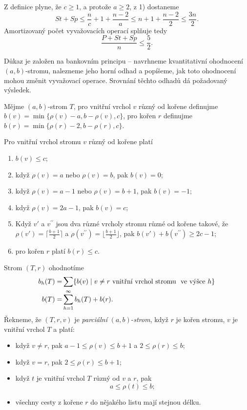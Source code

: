 \documentclass[a4paper,12pt]{article}
\begin{document}
Z definice plyne, že $c\ge 1$, a protože $a\ge 2$, z 1) dostaneme
$$St+Sp\le\frac nc+1+\frac {n-2}a\le n+1+\frac {n-2}2\le\frac {3n}
2.$$
Amortizovaný počet vyvažovacích operací splňuje tedy 
$$\frac {P+St+Sp}n\le\frac 52.$$

Důkaz je založen na bankovním principu -- 
navrhneme kvantitativní ohodnocení $(a,b)$-stromu, 
nalezneme jeho horní odhad a popíšeme, jak 
toto ohodnocení mohou změnit vyvažo\-vací ope\-race. Srovnání 
těchto odhadů dá požadovaný výsledek.

Mějme $(a,b)$-strom $T$, pro vnitřní vrchol 
$v$ různý od kořene definuj\-me 
$b(v)=\min\{\rho (v)-a,b-\rho (v),c\}$, pro 
kořen $r$ definuj\-me $b(r)=\min\{\rho (r)-2,b-\rho (r),c\}$. 

\begin{pozorovani}Pro vnitřní vrchol stromu $v$  
různý od kořene platí
\begin{enumerate}
\item
$b(v)\le c$;
\item
když $\rho (v)=a$ nebo $\rho (v)=b$, pak $b(v)=0$;
\item
když $\rho (v)=a-1$ nebo $\rho (v)=b+1$, pak $b(v)=-1$;
\item
když $\rho (v)=2a-1$, pak $b(v)=c$;
\item
Když $v'$ a $v^{\prime\prime}$ jsou dva různé vrcholy stromu 
různé od kořene takové, že $\rho (v')=\lceil\frac {
b+1}2\rceil$ a 
$\rho (v^{\prime\prime})=\lfloor\frac {b+1}2\rfloor$, pak $b(v')+
b(v^{\prime\prime})\ge 2c-1$;
\item
pro kořen $r$ platí $b(r)\le c$.
\end{enumerate}
\end{pozorovani}

Strom $(T,r)$ ohodnotíme 
\begin{align*} b_h(T)=&\sum \{b(v)\mid v\ne r\text{\rm\ vnitřní vrchol stromu }\text{\rm\ ve výšce }
h\}\\
b(T)=&\sum_{h=1}^{\infty}b_h(T)+b(r).\end{align*}
Řekneme, že $(T,r,v)$ je \emph{parciální} 
$(a,b)$-\emph{strom}, když $r$ je kořen stromu, $v$ je vnitřní 
vrchol $T$ a platí:
\begin{itemize}
\item
když $v\ne r$, pak $a-1\le\rho (v)\le b+1$ a $2\le\rho (r)\le 
b$;
\item
když $v=r$, pak $2\le\rho (r)\le b+1$;
\item
když $t$ je vnitřní vrchol $T$ různý od $v$ a $
r$, pak 
$$a\le\rho (t)\le b;$$
\item
všechny cesty z kořene $r$ do nějakého listu mají stejnou 
délku.
\end{itemize}
\end{document}
